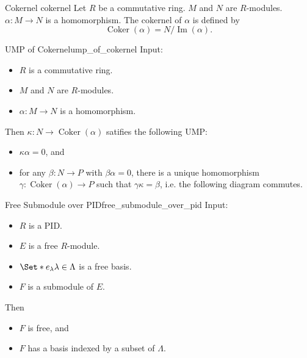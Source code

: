 \documentclass{article}
\begin{document}
\begin{definition}{Cokernel }{cokernel}
    Let $R$ be a commutative ring.
    $M$ and $N$ are $R$-modules.
    $\alpha: M\rightarrow N$ is a homomorphism.
    The cokernel of $\alpha$ is defined by
    \[ \operatorname{Coker}(\alpha) = N/\operatorname{Im}(\alpha). \]
\end{definition}

\begin{proposition}{UMP of Cokernel}{ump_of_cokernel}
    Input:
    \begin{itemize}
        \item $R$ is a commutative ring.
        \item $M$ and $N$ are $R$-modules.
        \item $\alpha: M\rightarrow N$ is a homomorphism.
    \end{itemize}
    Then $\kappa: N \rightarrow \operatorname{Coker}(\alpha)$ satifies the following UMP:
    \begin{itemize}
        \item $\kappa \alpha = 0$, and
        \item for any $\beta: N\rightarrow P$ with $\beta \alpha = 0$, there is a unique homomorphism $\gamma: \operatorname{Coker}(\alpha) \rightarrow P$ such that $\gamma \kappa = \beta$, i.e. the following diagram commutes.
    \end{itemize}
    \begin{center}
    \end{center}
\end{proposition}

\begin{theorem}{Free Submodule over PID}{free_submodule_over_pid}
    Input:
    \begin{itemize}
        \item $R$ is a PID.
        \item $E$ is a free $R$-module.
        \item $\Set*{e_\lambda}{\lambda\in\Lambda}$ is a free basis.
        \item $F$ is a submodule of $E$.
    \end{itemize}
    Then
    \begin{itemize}
        \item $F$ is free, and
        \item $F$ has a basis indexed by a subset of $\Lambda$.
    \end{itemize}
\end{theorem}
\end{document}
